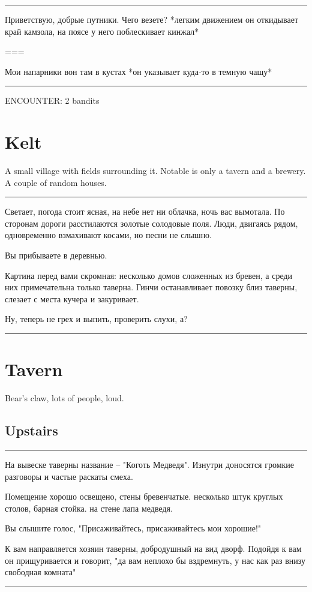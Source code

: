 \documentclass[a5paper,11pt]{book}
\newenvironment{boxed}
{\em\noindent\rule[1ex]{\linewidth}{0.1pt}\linebreak\indent}
{\par\noindent\rule[1ex]{\linewidth}{0.1pt}}
\begin{document}
\begin{multicols}{2}
\begin{boxed}
Приветствую, добрые путники. Чего везете? *легким движением он откидывает край камзола, на поясе у него поблескивает кинжал*

===

Мои напарники вон там в кустах *он указывает куда-то в темную чащу*
\end{boxed}

ENCOUNTER: 2 bandits

\section{Kelt}
A small village with fields surrounding it. Notable is only a tavern and a brewery. A couple of random houses.

\begin{boxed}
Светает, погода стоит ясная, на небе нет ни облачка, ночь вас вымотала. По сторонам дороги расстилаются золотые солодовые поля. Люди, двигаясь рядом, одновременно взмахивают косами, но песни не слышно.

Вы прибываете в деревнью.

Картина перед вами скромная: несколько домов сложенных из бревен, а среди них примечательна только таверна. Гинчи останавливает повозку близ таверны, слезает с места кучера и закуривает.

Ну, теперь не грех и выпить, проверить слухи, а?
\end{boxed}

\section{Tavern}
Bear's claw, lots of people, loud.

\subsection{Upstairs}

\begin{boxed}
На вывеске таверны название -- "Коготь Медведя". Изнутри доносятся громкие разговоры и частые раскаты смеха.

Помещение хорошо освещено, стены бревенчатые. несколько штук круглых столов, барная стойка. на стене лапа медведя.

Вы слышите голос, "Присаживайтесь, присаживайтесь мои хорошие!"

К вам направляется хозяин таверны, добродушный на вид дворф.  Подойдя к вам он прищуривается и говорит, "да вам неплохо бы вздремнуть, у нас как раз внизу свободная комната"
\end{boxed}


\end{multicols}
\end{document}
